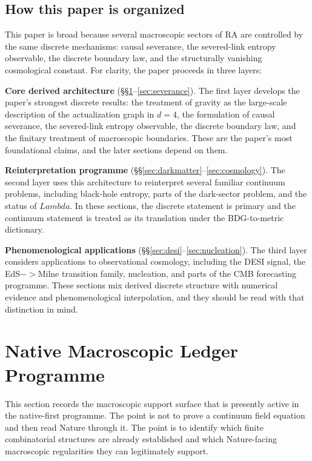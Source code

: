 \documentclass[11pt]{article}
\def\Lambda{Lambda}%
\def\to{->}%
\begin{document}
\subsection{How this paper is organized}

This paper is broad because several macroscopic sectors of RA are controlled by the same discrete mechanisms: causal severance, the severed-link entropy observable, the discrete boundary law, and the structurally vanishing cosmological constant. For clarity, the paper proceeds in three layers:

\textbf{Core derived architecture} (\S\S\ref{sec:gr}--\ref{sec:severance}). The first layer develops the paper's strongest discrete results: the treatment of gravity as the large-scale description of the actualization graph in $d=4$, the formulation of causal severance, the severed-link entropy observable, the discrete boundary law, and the finitary treatment of macroscopic boundaries. These are the paper's most foundational claims, and the later sections depend on them.

\textbf{Reinterpretation programme} (\S\S\ref{sec:darkmatter}--\ref{sec:cosmology}). The second layer uses this architecture to reinterpret several familiar continuum problems, including black-hole entropy, parts of the dark-sector problem, and the status of $\Lambda$. In these sections, the discrete statement is primary and the continuum statement is treated as its translation under the BDG-to-metric dictionary.

\textbf{Phenomenological applications} (\S\S\ref{sec:desi}--\ref{sec:nucleation}). The third layer considers applications to observational cosmology, including the DESI signal, the EdS$\to$Milne transition family, nucleation, and parts of the CMB forecasting programme. These sections mix derived discrete structure with numerical evidence and phenomenological interpolation, and they should be read with that distinction in mind.

\section{Native Macroscopic Ledger Programme}
\label{sec:gr}

This section records the macroscopic support surface that is presently active in the native-first programme. The point is not to prove a continuum field equation and then read Nature through it. The point is to identify which finite combinatorial structures are already established and which Nature-facing macroscopic regularities they can legitimately support.
\end{document}
